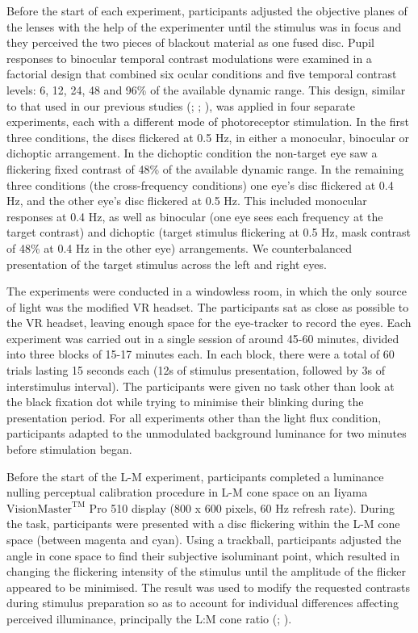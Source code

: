 \documentclass[
]{article}
\begin{document}
Before the start of each experiment, participants adjusted the objective planes of the lenses with the help of the experimenter until the stimulus was in focus and they perceived the two pieces of blackout material as one fused disc. Pupil responses to binocular temporal contrast modulations were examined in a factorial design that combined six ocular conditions and five temporal contrast levels: 6, 12, 24, 48 and 96\% of the available dynamic range. This design, similar to that used in our previous studies (; ; ), was applied in four separate experiments, each with a different mode of photoreceptor stimulation. In the first three conditions, the discs flickered at 0.5 Hz, in either a monocular, binocular or dichoptic arrangement. In the dichoptic condition the non-target eye saw a flickering fixed contrast of 48\% of the available dynamic range. In the remaining three conditions (the cross-frequency conditions) one eye's disc flickered at 0.4 Hz, and the other eye's disc flickered at 0.5 Hz. This included monocular responses at 0.4 Hz, as well as binocular (one eye sees each frequency at the target contrast) and dichoptic (target stimulus flickering at 0.5 Hz, mask contrast of 48\% at 0.4 Hz in the other eye) arrangements. We counterbalanced presentation of the target stimulus across the left and right eyes.

The experiments were conducted in a windowless room, in which the only source of light was the modified VR headset. The participants sat as close as possible to the VR headset, leaving enough space for the eye-tracker to record the eyes. Each experiment was carried out in a single session of around 45-60 minutes, divided into three blocks of 15-17 minutes each. In each block, there were a total of 60 trials lasting 15 seconds each (12s of stimulus presentation, followed by 3s of interstimulus interval). The participants were given no task other than look at the black fixation dot while trying to minimise their blinking during the presentation period. For all experiments other than the light flux condition, participants adapted to the unmodulated background luminance for two minutes before stimulation began.

Before the start of the L-M experiment, participants completed a luminance nulling perceptual calibration procedure in L-M cone space on an Iiyama \(\textrm{VisionMaster}^{\textrm{TM}}\) Pro 510 display (800 x 600 pixels, 60 Hz refresh rate). During the task, participants were presented with a disc flickering within the L-M cone space (between magenta and cyan). Using a trackball, participants adjusted the angle in cone space to find their subjective isoluminant point, which resulted in changing the flickering intensity of the stimulus until the amplitude of the flicker appeared to be minimised. The result was used to modify the requested contrasts during stimulus preparation so as to account for individual differences affecting perceived illuminance, principally the L:M cone ratio (; ).
\end{document}
